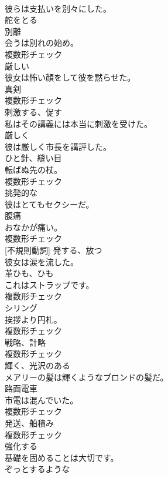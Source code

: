 \documentclass[8pt]{extreport}
\begin{document}
\begin{CJK}{UTF8}{min}
\\	彼らは支払いを別々にした。	
\\	[動詞]	舵をとる	
\\	[名詞]	別離	
\\	会うは別れの始め。	
\\	複数形チェック
\\	[形容詞]	厳しい	
\\	彼女は怖い顔をして彼を黙らせた。	
\\	[名詞]	真剣	
\\	複数形チェック
\\	[動詞]	刺激する、促す	
\\	私はその講義には本当に刺激を受けた。	
\\	[副詞]	厳しく	
\\	彼は厳しく市長を講評した。	
\\	[名詞]	ひと針、縫い目	
\\	転ばぬ先の杖。	
\\	複数形チェック
\\	[形容詞]	挑発的な	
\\	彼はとてもセクシーだ。	
\\	[名詞]	腹痛	
\\	おなかが痛い。	
\\	複数形チェック
\\	[動詞] [不規則動詞]	発する、放つ	
\\	彼女は涙を流した。	
\\	[名詞]	革ひも、ひも	
\\	これはストラップです。	
\\	複数形チェック
\\	[名詞]	シリング	
\\	挨拶より円札。	
\\	複数形チェック
\\	[名詞]	戦略、計略	
\\	複数形チェック
\\	[形容詞]	輝く、光沢のある	
\\	メアリーの髪は輝くようなブロンドの髪だ。	
\\	[名詞]	路面電車	
\\	市電は混んでいた。	
\\	複数形チェック
\\	[名詞]	発送、船積み	
\\	複数形チェック
\\	[動詞]	強化する	
\\	基礎を固めることは大切です。	
\\	[形容詞]	ぞっとするような	

\end{CJK}
\end{document}
